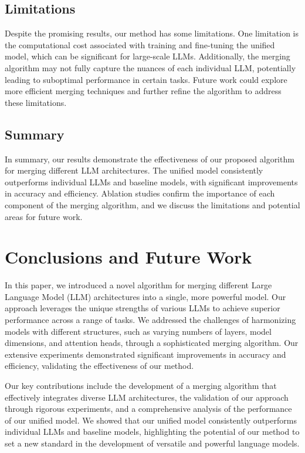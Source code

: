 \documentclass{article} %
\begin{document}
\subsection{Limitations}
Despite the promising results, our method has some limitations. One limitation is the computational cost associated with training and fine-tuning the unified model, which can be significant for large-scale LLMs. Additionally, the merging algorithm may not fully capture the nuances of each individual LLM, potentially leading to suboptimal performance in certain tasks. Future work could explore more efficient merging techniques and further refine the algorithm to address these limitations.

\subsection{Summary}
In summary, our results demonstrate the effectiveness of our proposed algorithm for merging different LLM architectures. The unified model consistently outperforms individual LLMs and baseline models, with significant improvements in accuracy and efficiency. Ablation studies confirm the importance of each component of the merging algorithm, and we discuss the limitations and potential areas for future work.

\section{Conclusions and Future Work}
\label{sec:conclusion}

In this paper, we introduced a novel algorithm for merging different Large Language Model (LLM) architectures into a single, more powerful model. Our approach leverages the unique strengths of various LLMs to achieve superior performance across a range of tasks. We addressed the challenges of harmonizing models with different structures, such as varying numbers of layers, model dimensions, and attention heads, through a sophisticated merging algorithm. Our extensive experiments demonstrated significant improvements in accuracy and efficiency, validating the effectiveness of our method.

Our key contributions include the development of a merging algorithm that effectively integrates diverse LLM architectures, the validation of our approach through rigorous experiments, and a comprehensive analysis of the performance of our unified model. We showed that our unified model consistently outperforms individual LLMs and baseline models, highlighting the potential of our method to set a new standard in the development of versatile and powerful language models.
\end{document}
